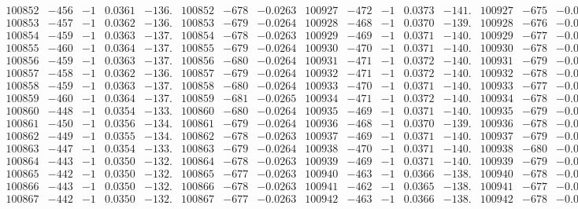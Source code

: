 \documentclass[11pt,reqno,a4letter]{article}
\numberwithin{figure}{section}
\numberwithin{table}{section}
\theoremstyle{plain}
\numberwithin{theorem}{section}
\theoremstyle{definition}
\begin{document}
\begin{table}[ht!]
\begin{equation*}
{\begin{array}{ccccc|ccc||ccccc|ccc}
100852 & -456 & -1 & 0.0361 & -136. & 100852 & -678 & -0.0263 & 100927 & -472 & -1 & 0.0373 & -141. & 100927 & -675 & -0.0262  \\
100853 & -457 & -1 & 0.0362 & -136. & 100853 & -679 & -0.0264 & 100928 & -468 & -1 & 0.0370 & -139. & 100928 & -676 & -0.0262  \\
100854 & -459 & -1 & 0.0363 & -137. & 100854 & -678 & -0.0263 & 100929 & -469 & -1 & 0.0371 & -140. & 100929 & -677 & -0.0263  \\
100855 & -460 & -1 & 0.0364 & -137. & 100855 & -679 & -0.0264 & 100930 & -470 & -1 & 0.0371 & -140. & 100930 & -678 & -0.0263  \\
100856 & -459 & -1 & 0.0363 & -137. & 100856 & -680 & -0.0264 & 100931 & -471 & -1 & 0.0372 & -140. & 100931 & -679 & -0.0264  \\
100857 & -458 & -1 & 0.0362 & -136. & 100857 & -679 & -0.0264 & 100932 & -471 & -1 & 0.0372 & -140. & 100932 & -678 & -0.0263  \\
100858 & -459 & -1 & 0.0363 & -137. & 100858 & -680 & -0.0264 & 100933 & -470 & -1 & 0.0371 & -140. & 100933 & -677 & -0.0263  \\
100859 & -460 & -1 & 0.0364 & -137. & 100859 & -681 & -0.0265 & 100934 & -471 & -1 & 0.0372 & -140. & 100934 & -678 & -0.0263  \\
100860 & -448 & -1 & 0.0354 & -133. & 100860 & -680 & -0.0264 & 100935 & -469 & -1 & 0.0371 & -140. & 100935 & -679 & -0.0264  \\
100861 & -450 & -1 & 0.0356 & -134. & 100861 & -679 & -0.0264 & 100936 & -468 & -1 & 0.0370 & -139. & 100936 & -678 & -0.0263  \\
100862 & -449 & -1 & 0.0355 & -134. & 100862 & -678 & -0.0263 & 100937 & -469 & -1 & 0.0371 & -140. & 100937 & -679 & -0.0264  \\
100863 & -447 & -1 & 0.0354 & -133. & 100863 & -679 & -0.0264 & 100938 & -470 & -1 & 0.0371 & -140. & 100938 & -680 & -0.0264  \\
100864 & -443 & -1 & 0.0350 & -132. & 100864 & -678 & -0.0263 & 100939 & -469 & -1 & 0.0371 & -140. & 100939 & -679 & -0.0264  \\
100865 & -442 & -1 & 0.0350 & -132. & 100865 & -677 & -0.0263 & 100940 & -463 & -1 & 0.0366 & -138. & 100940 & -678 & -0.0263  \\
100866 & -443 & -1 & 0.0350 & -132. & 100866 & -678 & -0.0263 & 100941 & -462 & -1 & 0.0365 & -138. & 100941 & -677 & -0.0263  \\
100867 & -442 & -1 & 0.0350 & -132. & 100867 & -677 & -0.0263 & 100942 & -463 & -1 & 0.0366 & -138. & 100942 & -678 & -0.0263  \\

\end{array}}
\end{equation*}
\end{table}
\end{document}
